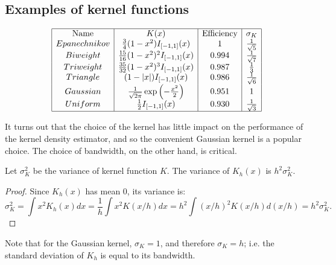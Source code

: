 \subsection{Examples of kernel functions}

\begin{table}[tbh]
\centering
$$\begin{array}{|c|c|c|c|}\hline
\textrm{Name}&	K(x)	&\textrm{Efficiency}&\sigma_K\\
Epanechnikov	&\frac{3}{4}(1-x^2)I_{[-1,1]}(x)&1&\frac{1}{\sqrt{5}}	 \\
Biweight	 &\frac{15}{16}(1-x^2)^2I_{[-1,1]}(x)&0.994	 &\frac{1}{\sqrt{7}}\\
Triweight	 &\frac{35}{32}(1-x^2)^3I_{[-1,1]}(x)&0.987	 &\frac{1}{3}\\
Triangle&(1-|x|)I_{[-1,1]}(x)&0.986	 &\frac{1}{\sqrt{6}}\\
Gaussian&\frac{1}{\sqrt{2\pi}}\exp\left(-\frac{x^2}{2}\right)	 &0.951&	1\\
Uniform&\frac{1}{2}I_{[-1,1]}(x)&0.930&\frac{1}{\sqrt{3}}	 \\\hline
\end{array}$$
\end{table}
It turns out that the choice of the kernel has little impact on the performance of the kernel density estimator, and so the convenient Gaussian kernel is a popular choice. The choice of bandwidth, on the other hand, is critical.

\begin{prop}
Let $\sigma^2_K$ be the variance of kernel function $K$. The variance of $K_h(x)$ is $h^2\sigma^2_K$.

\begin{proof}
Since $K_h(x)$ has mean 0, its variance is:
$$ \sigma_K^2=\int x^2K_h(x)dx=\frac{1}{h}\int x^2K(x/h)dx=h^2\int (x/h)^2K(x/h)d(x/h)=h^2\sigma^2_K.$$
\end{proof}
\end{prop}

Note that for the Gaussian kernel, $\sigma_K=1$, and therefore $\sigma_K=h$; i.e. the standard deviation of $K_h$ is equal to its bandwidth.

